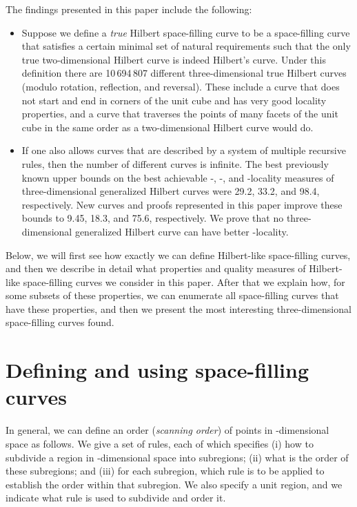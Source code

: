 \documentclass[11pt,a4paper]{article}
\begin{document}
The findings presented in this paper include the following:\begin{itemize}
\item Suppose we define a \emph{true} Hilbert space-filling curve to be a space-filling curve that satisfies a certain minimal set of natural requirements such that the only true two-dimensional Hilbert curve is indeed Hilbert's curve. Under this definition there are 10\,694\,807 different three-dimensional true Hilbert curves (modulo rotation, reflection, and reversal). These include a curve that does not start and end in corners of the unit cube and has very good locality properties, and a curve that traverses the points of many facets of the unit cube in the same order as a two-dimensional Hilbert curve would do.
\item If one also allows curves that are described by a system of multiple recursive rules, then the number of different curves is infinite.
    The best previously known upper bounds on the best achievable -, -, and -locality measures of three-dimensional generalized Hilbert curves were 29.2, 33.2, and 98.4, respectively. New curves and proofs represented in this paper improve these bounds to 9.45, 18.3, and 75.6, respectively. We prove that no three-dimensional generalized Hilbert curve can have better -locality.
\end{itemize}

Below, we will first see how exactly we can define Hilbert-like space-filling curves, and then we describe in detail what properties and quality measures of Hilbert-like space-filling curves we consider in this paper. After that we explain how, for some subsets of these properties, we can enumerate all space-filling curves that have these properties, and then we present the most interesting three-dimensional space-filling curves found.

\section{Defining and using space-filling curves}

In general, we can define an order (\emph{scanning order}) of points in -dimensional space as follows. We give a set of rules, each of which specifies (i) how to subdivide a region in -dimensional space into subregions; (ii) what is the order of these subregions; and (iii) for each subregion, which rule is to be applied to establish the order within that subregion. We also specify a unit region, and we indicate what rule is used to subdivide and order it.
\end{document}
